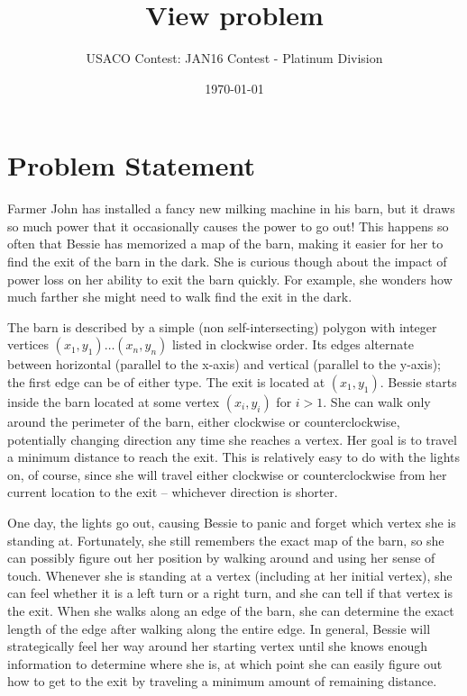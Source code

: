 \documentclass[12pt]{article}
\title{View problem}
\author{USACO Contest: JAN16 Contest - Platinum Division}
\date{\today}
\begin{document}
\maketitle

\section*{Problem Statement}

Farmer John has installed a fancy new milking machine in his barn, but it draws
so much power that it occasionally causes the power to go out!  This happens so
often that Bessie has memorized a map of the barn, making it easier for her to
find the exit of the barn in the dark.  She is curious though about the impact
of power loss on her ability to exit the barn quickly.  For example, she wonders
how much farther she might need to walk find the exit in the dark.

The barn is described by a simple (non self-intersecting) polygon with integer 
vertices $(x_1, y_1) \ldots (x_n, y_n)$ listed in clockwise order.  Its edges
alternate between horizontal (parallel to the x-axis) and vertical (parallel to
the y-axis); the first edge can be of either type. The exit is located at
$(x_1, y_1)$.  Bessie starts inside the barn located at some vertex 
$(x_i, y_i)$ for $i > 1$.  She can walk only around the perimeter of the barn,
either clockwise or counterclockwise, potentially changing direction any time
she reaches a vertex.  Her goal is to travel a minimum distance to reach the
exit. This is relatively easy to do with the lights on, of course, since she
will travel either clockwise or counterclockwise from her current location to
the  exit -- whichever direction is shorter.

One day, the lights go out, causing Bessie to panic and forget
which vertex she is standing at.  Fortunately, she still remembers the
exact map of the barn, so she can possibly figure out her position by
walking around and using her sense of touch.  Whenever she is standing
at a vertex (including at her initial vertex), she can feel whether it
is a left turn or a right turn, and she can tell if that vertex is the
exit.  When she walks along an edge of the barn, she can determine the
exact length of the edge after walking along the entire edge.  In
general, Bessie will strategically feel her way around her starting
vertex until she knows enough information to determine where she is,
at which point she can easily figure out how to get to the exit by
traveling a minimum amount of remaining distance.
\end{document}
